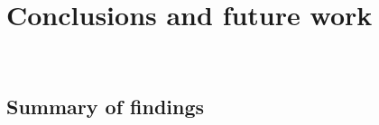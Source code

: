 \addchapheadtotoc
\chapter{Conclusions and future work}~\label{chapter:conclusion}

\section{Summary of findings}



